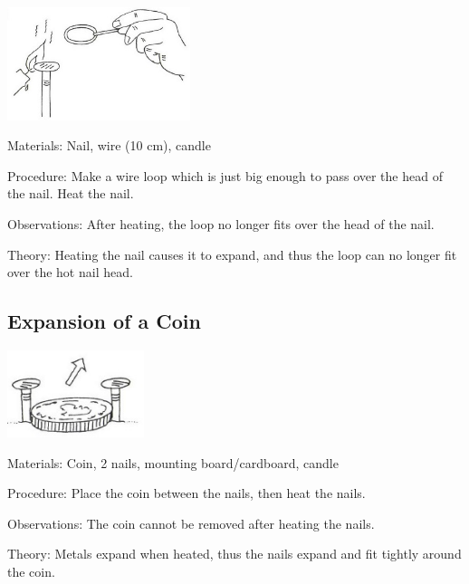 \begin{multicols}{2}
\begin{center}
\includegraphics[width=0.4\textwidth]{./img/vso/ring-nail.jpg}
\end{center}

\begin{description*}
\item[Materials:]{Nail, wire (10 cm), candle}
\item[Procedure:]{Make a wire loop which is just big enough to pass over the head of the nail. Heat the nail.}
\item[Observations:]{After heating, the loop no longer fits over the head of the nail.}
\item[Theory:]{Heating the nail causes it to expand, and thus the loop can no longer fit over the hot nail head.}
\end{description*}

\subsection{Expansion of a Coin}

\begin{center}
\includegraphics[width=0.3\textwidth]{./img/vso/expansion-coin.jpg}
\end{center}

\begin{description*}
\item[Materials:]{Coin, 2 nails, mounting board/cardboard, candle}
\item[Procedure:]{Place the coin between the nails, then heat the nails.}
\item[Observations:]{The coin cannot be removed after heating the nails.}
\item[Theory:]{Metals expand when heated, thus the nails expand and fit tightly around the coin.}
\end{description*}


\end{multicols}
